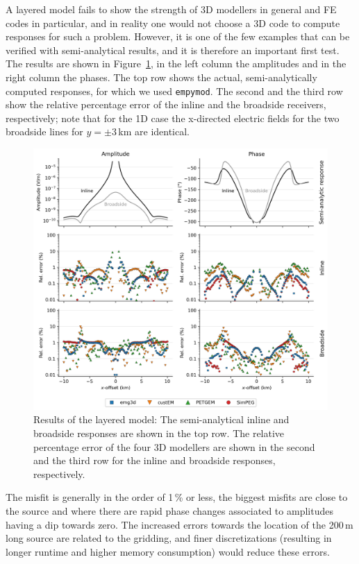 \documentclass[extra, camera,%
]{gji}
\newlength{\fwidth}
\newcommand{\empymod}{\texttt{empymod}\xspace}
\begin{document}
A layered model fails to show the strength of 3D modellers in general and FE codes in particular, and in reality one would not choose a 3D code to compute responses for such a problem. However, it is one of the few examples that can be verified with semi-analytical results, and it is therefore an important first test. The results are shown in Figure~\ref{fig:results-layered}, in the left column the amplitudes and in the right column the phases. The top row shows the actual, semi-analytically computed responses, for which we used \empymod\citep{GEO.17.Werthmuller}. The second and the third row show the relative percentage error of the inline and the broadside receivers, respectively; note that for the 1D case the x-directed electric fields for the two broadside lines for $y=\pm3\,$km are identical.
%
\begin{figure}
  \centering
  \includegraphics[width=.9\fwidth]{figures/results-layered.png}
  \caption{Results of the layered model: The semi-analytical inline and broadside responses are shown in the top row. The relative percentage error of the four 3D modellers are shown in the second and the third row for the inline and broadside responses, respectively.}
  \label{fig:results-layered}
\end{figure}
%
The misfit is generally in the order of 1\,\% or less, the biggest misfits are close to the source and where there are rapid phase changes associated to amplitudes having a dip towards zero. The increased errors towards the location of the 200\,m long source are related to the gridding, and finer discretizations (resulting in longer runtime and higher memory consumption) would reduce these errors.
\end{document}
